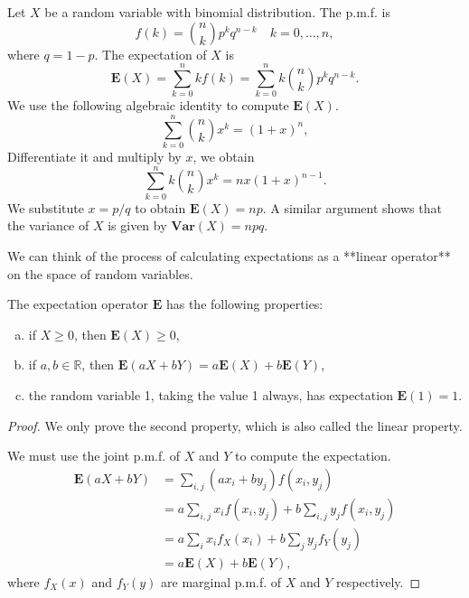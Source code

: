 \begin{example}
Let $X$ be a random variable with binomial distribution. The p.m.f. is 
\begin{equation*}
    f(k) = \binom{n}{k} p^k q^{n-k} \quad k = 0,\dots, n,
\end{equation*}
where $q = 1-p$. The expectation of $X$ is
\begin{equation*}
    \mathbf{E}(X) = \sum_{k=0}^n k f(k) = \sum_{k=0}^n k\binom{n}{k} p^k q^{n-k}.
\end{equation*}
We use the following algebraic identity to compute $\mathbf{E}(X)$.
\begin{equation}
    \label{eq:4.2}
    \tag{4-2}
    \sum_{k=0}^n \binom{n}{k} x^k = (1+x)^n, 
\end{equation}
Differentiate it and multiply by $x$, we obtain 
\begin{equation}
    \label{eq:4.3}
    \tag{4-3}
    \sum_{k=0}^n k \binom{n}{k} x^k = nx(1+x)^{n-1}. 
\end{equation}
We substitute $x = p / q$ to obtain $\mathbf{E}(X) = np$. A similar argument shows that the variance of $X$ is given by $\mathbf{Var}(X) = npq$. 
\end{example}

We can think of the process of calculating expectations as a **linear operator** on the space of random variables. 

\begin{theorem}
The expectation operator $\mathbf{E}$ has the following properties: 
\begin{enumerate}[(a)]
    \item if $X\geq 0$, then $\mathbf{E}(X) \geq 0$,
    \item if $a, b \in \mathbb{R}$, then $\mathbf{E}(aX+bY) = a\mathbf{E}(X) + b\mathbf{E}(Y)$,
    \item the random variable 1, taking the value 1 always, has expectation $\mathbf{E}(1) = 1$. 
\end{enumerate}
\end{theorem}

\begin{proof}
We only prove the second property, which is also called the linear property.

We must use the joint p.m.f. of $X$ and $Y$ to compute the expectation. 
\begin{equation*}
    \begin{split}
        \mathbf{E}(aX+bY) &= \sum_{i, j} (ax_i + by_j) f(x_i, y_j) \\
        &= a \sum_{i,j} x_i f(x_i, y_j) + b\sum_{i,j} y_j f(x_i, y_j) \\
        &= a\sum_{i} x_i f_X(x_i) + b\sum_{j}y_j f_Y(y_j) \\ 
        &= a\mathbf{E}(X) + b\mathbf{E}(Y),
    \end{split}
\end{equation*}
where $f_X(x)$ and $f_Y(y)$ are marginal p.m.f. of $X$ and $Y$ respectively.
\end{proof}

